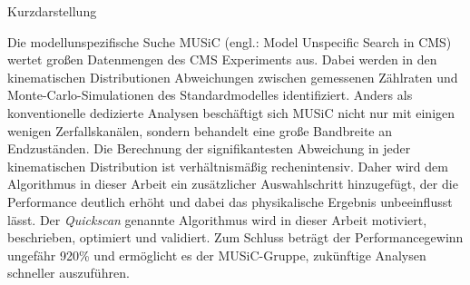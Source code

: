 
\vspace*{\fill}
{Kurzdarstellung}
\chapterheadendvskip

Die modellunspezifische Suche MUSiC (engl.: Model Unspecific Search in CMS) wertet großen Datenmengen des CMS Experiments aus. Dabei werden in den kinematischen Distributionen Abweichungen zwischen gemessenen Zählraten und Monte-Carlo-Simulationen des Standardmodelles identifiziert. Anders als konventionelle dedizierte Analysen beschäftigt sich MUSiC nicht nur mit einigen wenigen Zerfallskanälen, sondern behandelt eine große Bandbreite an Endzuständen. 
Die Berechnung der signifikantesten Abweichung in jeder kinematischen Distribution ist verhältnismäßig rechenintensiv. Daher wird dem Algorithmus in dieser Arbeit ein zusätzlicher Auswahlschritt hinzugefügt, der die Performance deutlich erhöht und dabei das physikalische Ergebnis unbeeinflusst lässt. 
Der \emph{Quickscan} genannte Algorithmus wird in dieser Arbeit motiviert, beschrieben, optimiert und validiert. Zum Schluss beträgt der Performancegewinn ungefähr \si{920}{\%} und ermöglicht es der MUSiC-Gruppe, zukünftige Analysen schneller auszuführen.